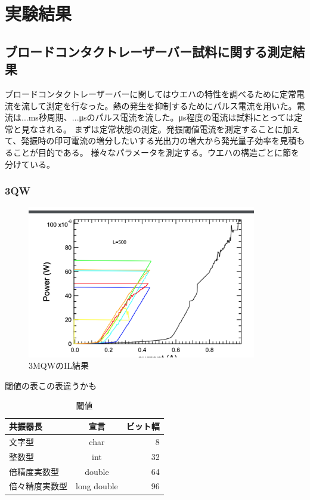 \chapter{実験結果}
\section{ブロードコンタクトレーザーバー試料に関する測定結果}%
ブロードコンタクトレーザーバーに関してはウエハの特性を調べるために定常電流を流して測定を行なった。熱の発生を抑制するためにパルス電流を用いた。電流は...ms秒周期、...μsのパルス電流を流した。μs程度の電流は試料にとっては定常と見なされる。
まずは定常状態の測定。発振閾値電流を測定することに加えて、発振時の印可電流の増分したいする光出力の増大から発光量子効率を見積もることが目的である。
様々なパラメータを測定する。ウエハの構造ごとに節を分けている。
\subsection{3QW}%
\begin{figure}[h]
	\centering
	\includegraphics[width=10cm]{figure/fig_3_1_IL_broad_3QW.png}
		\caption{3MQWのIL結果}
		\label{fig_3_1_IL_3QW.png}
\end{figure}
閾値の表この表違うかも
\begin{table}[hbtp]
  \caption{閾値}
  \label{table:data_type}
  \centering
  \begin{tabular}{lcr}
    \hline
    共振器長  & 宣言  &  ビット幅  \\
    \hline \hline
    文字型  & char  & 8 \\
    整数型  & int   & 32 \\
    倍精度実数型  & double  & 64 \\
    倍々精度実数型  &  long double  &  96 \\
    \hline
  \end{tabular}
\end{table}

